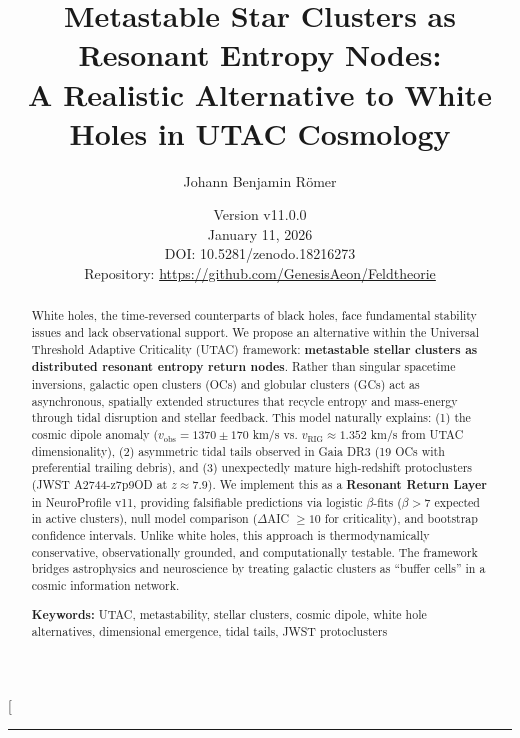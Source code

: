 \documentclass[11pt,a4paper,twocolumn]{article}
\title{\textbf{Metastable Star Clusters as Resonant Entropy Nodes:\\ A Realistic Alternative to White Holes in UTAC Cosmology}}
\author[1]{Johann Benjamin Römer}
\affil[1]{GenesisAeon Project, Independent Researcher\\
\texttt{GitHub: @GenesisAeon/Feldtheorie}}
\date{Version v11.0.0 \\ January 11, 2026 \\ 
\small DOI: 10.5281/zenodo.18216273 \\
\small Repository: \url{https://github.com/GenesisAeon/Feldtheorie}}
\begin{document}
\twocolumn[
\begin{@twocolumnfalse}
\maketitle

\begin{abstract}
\noindent White holes, the time-reversed counterparts of black holes, face fundamental stability issues and lack observational support. We propose an alternative within the Universal Threshold Adaptive Criticality (UTAC) framework: \textbf{metastable stellar clusters as distributed resonant entropy return nodes}. Rather than singular spacetime inversions, galactic open clusters (OCs) and globular clusters (GCs) act as asynchronous, spatially extended structures that recycle entropy and mass-energy through tidal disruption and stellar feedback. This model naturally explains: (1) the cosmic dipole anomaly ($v_{\text{obs}} = 1370 \pm 170$ km/s vs. $v_{\text{RIG}} \approx 1.352$ km/s from UTAC dimensionality), (2) asymmetric tidal tails observed in Gaia DR3 (19 OCs with preferential trailing debris), and (3) unexpectedly mature high-redshift protoclusters (JWST A2744-z7p9OD at $z \approx 7.9$). We implement this as a \textbf{Resonant Return Layer} in NeuroProfile v11, providing falsifiable predictions via logistic $\beta$-fits ($\beta > 7$ expected in active clusters), null model comparison ($\Delta$AIC $\geq 10$ for criticality), and bootstrap confidence intervals. Unlike white holes, this approach is thermodynamically conservative, observationally grounded, and computationally testable. The framework bridges astrophysics and neuroscience by treating galactic clusters as ``buffer cells'' in a cosmic information network.

\vspace{0.5em}
\noindent \textbf{Keywords:} UTAC, metastability, stellar clusters, cosmic dipole, white hole alternatives, dimensional emergence, tidal tails, JWST protoclusters
\end{abstract}

\begin{center}
\rule{0.9\textwidth}{0.4pt}
\end{center}

\begin{abstract}

\end{abstract}
\end{@twocolumnfalse}
\end{document}
